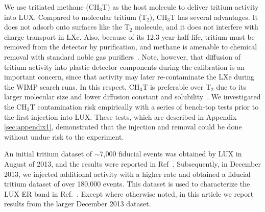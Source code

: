 We use tritiated methane (CH$_3$T) as the host molecule to deliver tritium activity into LUX. Compared to molecular tritium (T$_2$), CH$_3$T has several advantages. It does not adsorb onto surfaces like the T$_2$ molecule, and it does not interfere with charge transport in LXe. Also, because of its 12.3 year half-life, tritium must be removed from the detector by purification, and methane is amenable to chemical removal with standard noble gas purifiers~\cite{Dobi_CH4}. Note, however, that diffusion of tritium activity into plastic detector components during the calibration is an important concern, since that activity may later re-contaminate the LXe during the WIMP search runs.  In this respect, CH$_3$T is preferable over T$_2$ due to its larger molecular size and lower diffusion constant and solubility~\cite{miyake:1983}. We investigated the CH$_3$T contamination risk empirically with a series of bench-top tests prior to the first injection into LUX. These tests, which are described in Appendix \ref{sec:appendix1}, demonstrated that the injection and removal could be done without undue risk to the experiment. 

An initial tritium dataset of $\sim$7,000 fiducial events was obtained by LUX in August of 2013, and the results were reported in Ref~\cite{lux-prl}. Subsequently, in December 2013, we injected additional activity with a higher rate and obtained a fiducial tritium dataset of over 180,000 events. This dataset is used to characterize the LUX ER band in Ref.~\cite{lux-reanalysis}. Except where otherwise noted, in this article we report results from the larger December 2013 dataset.
